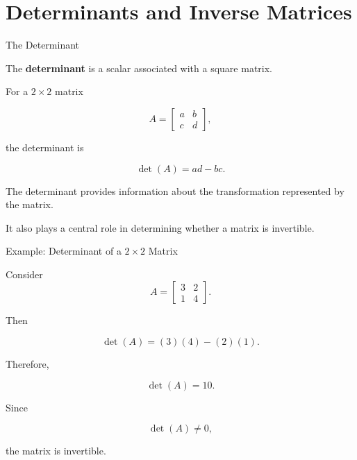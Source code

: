 

\section{Determinants and Inverse Matrices}


\begin{frame}{The Determinant}

The \textbf{determinant} is a scalar associated with a
square matrix.

For a $2\times2$ matrix

\[
A=
\begin{bmatrix}
a&b\\
c&d
\end{bmatrix},
\]

the determinant is

\[
\boxed{
\det(A)=ad-bc.
}
\]

\vspace{0.4cm}

The determinant provides information about the transformation
represented by the matrix.

\vspace{0.3cm}

It also plays a central role in determining whether a matrix
is invertible.

\end{frame}



\begin{frame}{Example: Determinant of a $2\times2$ Matrix}

Consider
\vspace{-0.1cm}
\[
A=
\begin{bmatrix}
3&2\\
1&4
\end{bmatrix}.
\]

Then

\[
\det(A)
=
(3)(4)-(2)(1).
\]

Therefore,

\[
\boxed{
\det(A)=10.
}
\]

Since

\[
\det(A)\neq0,
\]

the matrix is invertible.

\end{frame}


